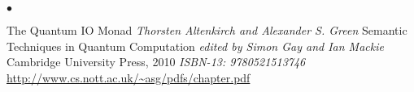 \documentclass[line]{res}
\newenvironment{list2}{
  \begin{list}{$\bullet$}{%
      \setlength{\itemsep}{0in}
      \setlength{\parsep}{0.045in} \setlength{\parskip}{0in}
      \setlength{\topsep}{0in} \setlength{\partopsep}{0in}
      \setlength{\leftmargin}{0.2in}}}{\end{list}}
\begin{document}
\begin{resume}
\begin{list2}
\item The Quantum IO Monad
\emph{Thorsten Altenkirch and Alexander S. Green}
Semantic Techniques in Quantum Computation 
\emph{edited by Simon Gay and Ian Mackie}
Cambridge University Press, 2010
\emph{ISBN-13: 9780521513746}
\url{http://www.cs.nott.ac.uk/~asg/pdfs/chapter.pdf}

\end{list2}

\end{resume}
\end{document}
